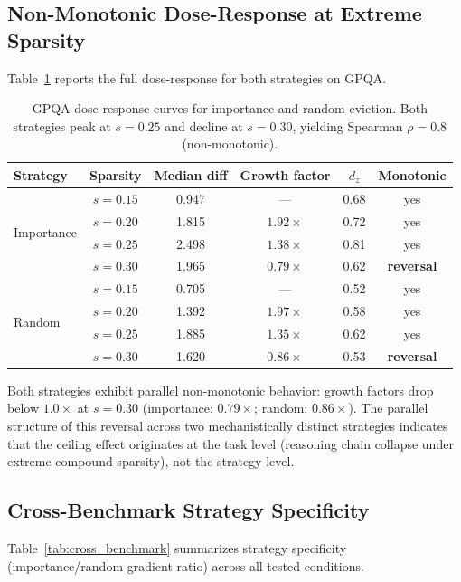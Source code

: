 \documentclass[11pt,a4paper]{article}
\begin{document}
\subsection{Non-Monotonic Dose-Response at Extreme Sparsity}

Table~\ref{tab:dose_response} reports the full dose-response for both strategies on GPQA.

\begin{table}[h]
\centering
\caption{GPQA dose-response curves for importance and random eviction. Both strategies peak at $s=0.25$ and decline at $s=0.30$, yielding Spearman $\rho = 0.8$ (non-monotonic).}
\label{tab:dose_response}
\small
\begin{tabular}{lccccc}
\toprule
Strategy & Sparsity & Median diff & Growth factor & $d_z$ & Monotonic \\
\midrule
\multirow{4}{*}{Importance} & $s=0.15$ & 0.947 & --- & 0.68 & yes \\
 & $s=0.20$ & 1.815 & $1.92\times$ & 0.72 & yes \\
 & $s=0.25$ & 2.498 & $1.38\times$ & 0.81 & yes \\
 & $s=0.30$ & 1.965 & $0.79\times$ & 0.62 & \textbf{reversal} \\
\midrule
\multirow{4}{*}{Random} & $s=0.15$ & 0.705 & --- & 0.52 & yes \\
 & $s=0.20$ & 1.392 & $1.97\times$ & 0.58 & yes \\
 & $s=0.25$ & 1.885 & $1.35\times$ & 0.62 & yes \\
 & $s=0.30$ & 1.620 & $0.86\times$ & 0.53 & \textbf{reversal} \\
\bottomrule
\end{tabular}
\end{table}

Both strategies exhibit parallel non-monotonic behavior: growth factors drop below $1.0\times$ at $s=0.30$ (importance: $0.79\times$; random: $0.86\times$). The parallel structure of this reversal across two mechanistically distinct strategies indicates that the ceiling effect originates at the task level (reasoning chain collapse under extreme compound sparsity), not the strategy level.

\subsection{Cross-Benchmark Strategy Specificity}

Table~\ref{tab:cross_benchmark} summarizes strategy specificity (importance/random gradient ratio) across all tested conditions.
\end{document}
